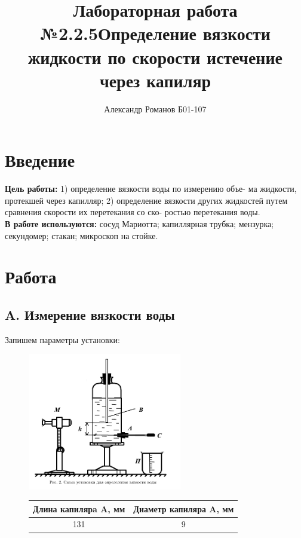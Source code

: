 \documentclass{article}
\author{Александр Романов Б01-107}
\date{}
\title{Лабораторная работа №2.2.5\newline Определение вязкости жидкости по скорости истечение через капиляр}
\begin{document}
\maketitle
\newpage
\section{Введение}

\textbf{Цель работы:} 1) определение вязкости воды по измерению объе-
ма жидкости, протекшей через капилляр; 2) определение вязкости
других жидкостей путем сравнения скорости их перетекания со ско-
ростью перетекания воды.\\
\textbf{В работе используются:} сосуд Мариотта; капиллярная трубка;
мензурка; секундомер; стакан; микроскоп на стойке.

\section{Работа}
\subsection{A. Измерение вязкости воды}
Запишем параметры установки:

\begin{figure}[H]
    \centering
    \includegraphics[width=0.6\textwidth]{device.png}
\end{figure}

\begin{figure}[H]
    \centering
    \begin{tabular}{|c|c|}
        \hline
        Длина капилярa A, мм&Диаметр капиляра A, мм\\\hline
        131&9\\\hline
    \end{tabular}
\end{figure}
\end{document}
